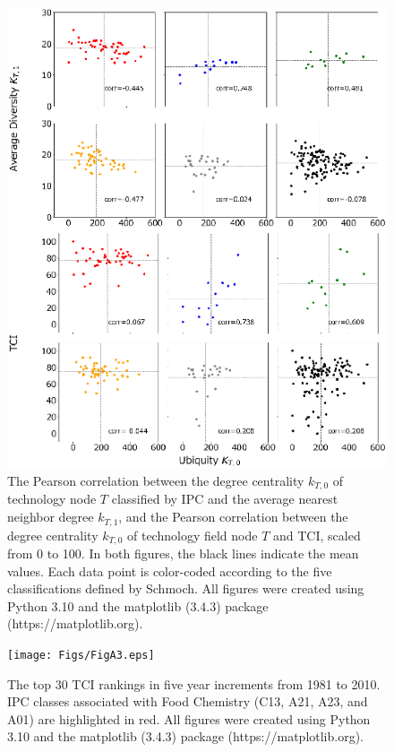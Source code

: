 \documentclass[fleqn,10pt]{wlscirep}
\begin{document}
\begin{figure}[ht]
    \centering
    \includegraphics[scale=0.75]{Figs/FigA2.eps}
    \caption{The Pearson correlation between the degree centrality \( k_{T,0} \) of technology node \( T \) classified by IPC and the average nearest neighbor degree \( k_{T,1} \), and the Pearson correlation between the degree centrality \( k_{T,0} \) of technology field node \( T \) and TCI, scaled from 0 to 100. In both figures, the black lines indicate the mean values. Each data point is color-coded according to the five classifications defined by Schmoch\cite{Schmoch2008}.
    All figures were created using Python 3.10 and the matplotlib (3.4.3) package (https://matplotlib.org).}
    \label{fig:persector}
\end{figure}

\begin{figure}[ht]
    \centering
    \texttt{[image: Figs/FigA3.eps]}
    \caption{The top 30 TCI rankings in five year increments from 1981 to 2010. IPC classes associated with Food Chemistry (C13, A21, A23, and A01) are highlighted in red.
    All figures were created using Python 3.10 and the matplotlib (3.4.3) package (https://matplotlib.org).}
    \label{fig:bump}
\end{figure}
\end{document}
